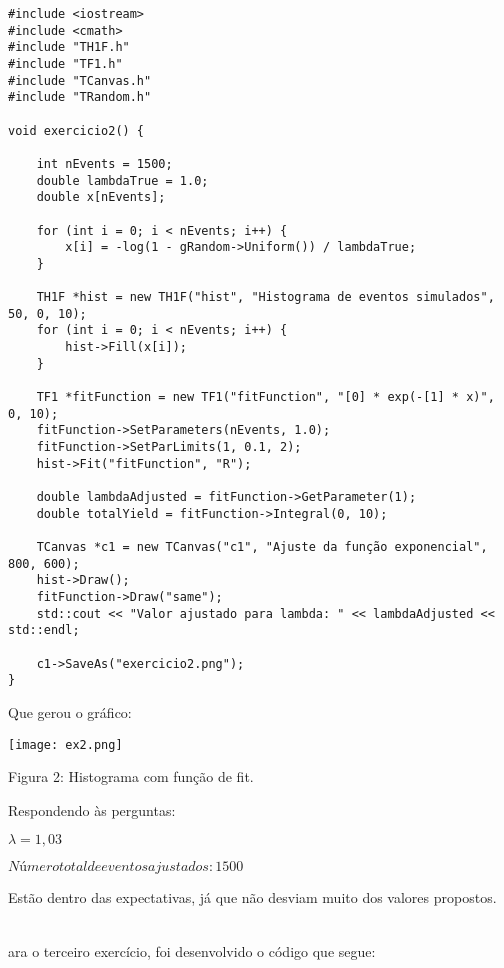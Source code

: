 \documentclass[a4 paper]{article}
\numberwithin{equation}{section}
\newcommand{\problem}[2]{~\\\fbox{\textbf{#1}}\hfill \newline\newline}
\newcommand{\0}{\mathbf{0}}
\begin{document}
\begin{lstlisting}
#include <iostream>
#include <cmath>
#include "TH1F.h"
#include "TF1.h"
#include "TCanvas.h"
#include "TRandom.h"

void exercicio2() {

	int nEvents = 1500;
	double lambdaTrue = 1.0;
	double x[nEvents];

	for (int i = 0; i < nEvents; i++) {
		x[i] = -log(1 - gRandom->Uniform()) / lambdaTrue;
	}

	TH1F *hist = new TH1F("hist", "Histograma de eventos simulados", 50, 0, 10);
	for (int i = 0; i < nEvents; i++) {
		hist->Fill(x[i]);
	}

	TF1 *fitFunction = new TF1("fitFunction", "[0] * exp(-[1] * x)", 0, 10);
	fitFunction->SetParameters(nEvents, 1.0);
	fitFunction->SetParLimits(1, 0.1, 2);
	hist->Fit("fitFunction", "R");

	double lambdaAdjusted = fitFunction->GetParameter(1);
	double totalYield = fitFunction->Integral(0, 10);
 
	TCanvas *c1 = new TCanvas("c1", "Ajuste da função exponencial", 800, 600);
	hist->Draw();
	fitFunction->Draw("same");
	std::cout << "Valor ajustado para lambda: " << lambdaAdjusted << std::endl;

	c1->SaveAs("exercicio2.png");
}
\end{lstlisting}
Que gerou o gráfico:

\texttt{[image: ex2.png]}
\begin{center}
    Figura 2: Histograma com função de fit.
\end{center}

Respondendo às perguntas:

$\lambda=1,03$

$Número total de eventos ajustados: 1500$

Estão dentro das expectativas, já que não desviam muito dos valores propostos.

\newpage

\problem{EXERCICIO 3 }

Para o terceiro exercício, foi desenvolvido o código que segue:
\end{document}
